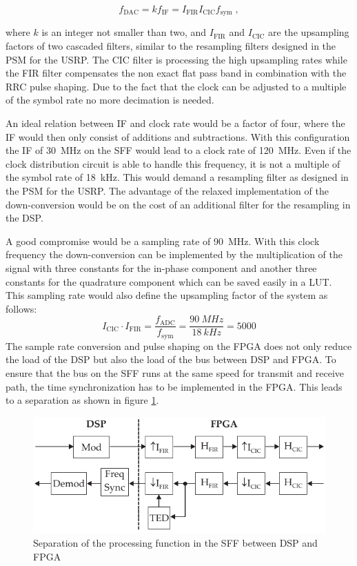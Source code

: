 \begin{equation}
f_\text{DAC} = k f_\text{IF} = I_\text{FIR} I_\text{CIC} f_\text{sym}\;,
\end{equation}

where $k$ is an integer not smaller than two, and $I_\text{FIR}$ and $I_\text{CIC}$ are the upsampling factors of two cascaded filters, similar to the resampling filters designed in the \ac{PSM} for the \ac{USRP}. The \ac{CIC} filter is  processing the high upsampling rates while the \ac{FIR} filter compensates the non exact flat pass band in combination with the \ac{RRC} pulse shaping. Due to the fact that the clock can be adjusted to a multiple of the symbol rate no more decimation is needed.

An ideal relation between \ac{IF} and clock rate would be a factor of four, where the \ac{IF} would then only consist of additions and subtractions. With this configuration the \ac{IF} of \SI{30}{MHz} on the SFF would lead to a clock rate of \SI{120}{MHz}. Even if the clock distribution circuit is able to handle this frequency, it is not a multiple of the symbol rate of \SI{18}{kHz}. This would demand a resampling filter as designed in the \ac{PSM} for the \ac{USRP}. The advantage of the relaxed implementation of the down-conversion would be on the cost of an additional filter for the resampling in the DSP.

A good compromise would be a sampling rate of \SI{90}{MHz}. With this clock frequency the down-conversion can be implemented by the multiplication of the signal with three constants for the in-phase component and another three constants for the quadrature component which can be saved easily in a \ac{LUT}. This sampling rate would also define the upsampling factor of the system as follows:
\begin{equation}
I_\text{CIC} \cdot I_\text{FIR} = \frac{f_\text{ADC}}{f_\text{sym}} =  \frac{\SI{90}{MHz}}{\SI{18}{kHz}} = 5000
\end{equation}
The sample rate conversion and pulse shaping on the FPGA does not only reduce the load of the \ac{DSP} but also the load of the bus between DSP and FPGA. To ensure that the bus on the SFF runs at the same speed for transmit and receive path, the time synchronization has to be implemented in the FPGA. This leads to a separation as shown in figure \ref{fig:sep_sff}.


\begin{figure}[htb]
	\centering
		\includegraphics{../kapitel04/figures/sep_sff.pdf}
	\caption{Separation of the processing function in the SFF between DSP and FPGA}
	\label{fig:sep_sff}
\end{figure}

